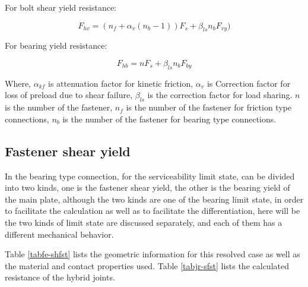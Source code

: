 For bolt shear yield resistance:

\begin{equation}
    F_{hv} = (n_f + \alpha_{v}(n_b-1)) F_s + \beta_{ls} n_b F_{vy})
\end{equation}

For bearing yield resistance:

\begin{equation}
    F_{hb} = n F_s + \beta_{ls} n_b F_{by}
\end{equation}

Where, $\alpha_{kf}$ is attenuation factor for kinetic friction, $\alpha_v$ is Correction factor for loss of preload due to shear failure, $\beta_{ls}$ is the correction factor for load sharing. $n$ is the number of the fastener, $n_f$ is the number of the fastener for friction type connections, $n_b$ is the number of the fastener for bearing type connections.

\subsection{Fastener shear yield}

In the bearing type connection, for the serviceability limit state, can be divided into two kinds, one is the fastener shear yield, the other is the bearing yield of the main plate, although the two kinds are one of the bearing limit state, in order to facilitate the calculation as well as to facilitate the differentiation, here will be the two kinds of limit state are discussed separately, and each of them has a different mechanical behavior.

Table \ref{tabfe-shfst} lists the geometric information for this resolved case as well as the material and contact properties used. Table \ref{tabjr-sfst} lists the calculated resistance of the hybrid joints.

